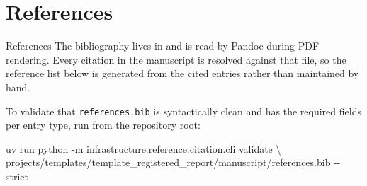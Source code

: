 \documentclass[
  ignorenonframetext,
]{beamer}
\author{\texorpdfstring{}{}}
\date{}
\newenvironment{Shaded}{}{}
\newcommand{\AttributeTok}[1]{\textcolor[rgb]{0.49,0.56,0.16}{#1}}
\newcommand{\DataTypeTok}[1]{\textcolor[rgb]{0.56,0.13,0.00}{#1}}
\newcommand{\ExtensionTok}[1]{#1}
\newcommand{\NormalTok}[1]{#1}
\begin{document}
\section{References}\label{sec:references}

\begin{frame}{References}
The bibliography lives in
\href{references.bib}{} and is read by
Pandoc during PDF rendering. Every \texttt{\breakseq{[@key]}} citation in the
manuscript is resolved against that file, so the reference list below is
generated from the cited entries rather than maintained by hand.

To validate that \texttt{references.bib} is syntactically clean and has
the required fields per entry type, run from the repository root:

\begin{Shaded}
\begin{Highlighting}[]
\ExtensionTok{uv}\NormalTok{ run python }\AttributeTok{{-}m}\NormalTok{ infrastructure.reference.citation.cli validate }\DataTypeTok{\textbackslash{}}
\NormalTok{    projects/templates/template\_registered\_report/manuscript/references.bib }\AttributeTok{{-}{-}strict}
\end{Highlighting}
\end{Shaded}
\end{frame}
\end{document}
